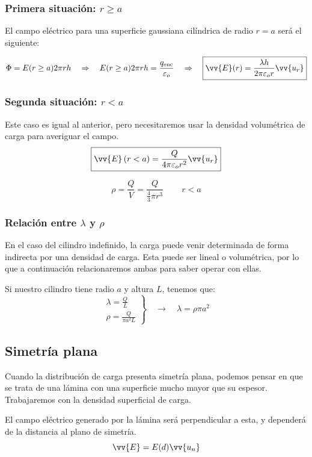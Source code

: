 \documentclass[a4paper]{book}
\numberwithin{figure}{chapter}
\numberwithin{equation}{chapter}
\newcommand{\subtext}[1]{_{\text{#1}}}
\renewcommand{\vec}[1]{\vv{{#1}}}
\begin{document}
\subsubsection{Primera situación: $r\geq a$}
El campo eléctrico para una superficie gaussiana cilíndrica de radio $r=a$ será el siguiente:

\[\Phi = E(r\geq a)2\pi rh \quad \Rightarrow \quad E(r\geq a)2\pi rh=\frac{q\subtext{enc}}{\varepsilon_o} \quad \Rightarrow \quad \boxed{\vec{E}(r) = \frac{\lambda h}{2\pi \varepsilon_o r}\vec{u_r}}\]

\subsubsection{Segunda situación: $r<a$}
Este caso es igual al anterior, pero necesitaremos usar la densidad volumétrica de carga para averiguar el campo.
\[\boxed{\vec{E}\left( r<a \right) = \frac{Q}{4\pi \varepsilon_o r^2}\vec{u_r}}\]

\[\rho = \frac{Q}{V} = \frac{Q}{\frac{4}{3}\pi r^3} \, \qquad r<a\]

\subsubsection{\texorpdfstring{Relación entre $\lambda$ y $\rho$}{Relación entre lambda y rho}}
En el caso del cilindro indefinido, la carga puede venir determinada de forma indirecta por una densidad de carga. Esta puede ser lineal o volumétrica, por lo que a continuación relacionaremos ambas para saber operar con ellas.

Si nuestro cilindro tiene radio $a$ y altura $L$, tenemos que:
\[\left. \begin{matrix}
		\lambda = \frac{Q}{L} \\[5pt]
		\rho = \frac{Q}{\pi a^2 L}
	\end{matrix}\right\} \quad \longrightarrow \quad \boxed{\lambda  = \rho \pi a^2}\]

\subsection{Simetría plana}
Cuando la distribución de carga presenta simetría plana, podemos pensar en que se trata de una lámina con una superficie mucho mayor que su espesor. Trabajaremos con la densidad superficial de carga.

El campo eléctrico generado por la lámina será perpendicular a esta, y dependerá de la distancia al plano de simetría.
\[\vec{E}=E(d)\vec{u_n}\]
\end{document}
